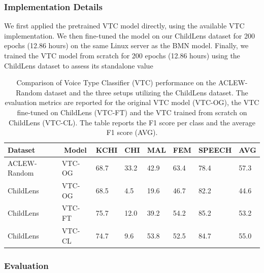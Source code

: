 \documentclass[
  man,floatsintext]{apa6}
\begin{document}
\subsubsection{Implementation Details}\label{implementation-details-1}

We first applied the pretrained VTC model directly, using the available VTC implementation. We then fine-tuned the model on our ChildLens dataset for 200 epochs (12.86 hours) on the same Linux server as the BMN model. Finally, we trained the VTC model from scratch for 200 epochs (12.86 hours) using the ChildLens dataset to assess its standalone value

\begin{table}[tbp]

\begin{center}
\begin{threeparttable}

\caption{\label{tab:vtc-results}Comparison of Voice Type Classifier (VTC) performance on the ACLEW-Random dataset and the three setups utilizing the ChildLens dataset. The evaluation metrics are reported for the original VTC model (VTC-OG), the VTC fine-tuned on ChildLens (VTC-FT) and the VTC trained from scratch on ChildLens (VTC-CL). The table reports the F1 score per class and the average F1 score (AVG).
}

\begin{tabular}{llllllll}
\toprule
Dataset & \multicolumn{1}{c}{Model} & \multicolumn{1}{c}{KCHI} & \multicolumn{1}{c}{CHI} & \multicolumn{1}{c}{MAL} & \multicolumn{1}{c}{FEM} & \multicolumn{1}{c}{SPEECH} & \multicolumn{1}{c}{AVG}\\
\midrule
ACLEW-Random & VTC-OG & 68.7 & 33.2 & 42.9 & 63.4 & 78.4 & 57.3\\
ChildLens & VTC-OG & 68.5 & 4.5 & 19.6 & 46.7 & 82.2 & 44.6\\
ChildLens & VTC-FT & 75.7 & 12.0 & 39.2 & 54.2 & 85.2 & 53.2\\
ChildLens & VTC-CL & 74.7 & 9.6 & 53.8 & 52.5 & 84.7 & 55.0\\
\bottomrule
\end{tabular}

\end{threeparttable}
\end{center}

\end{table}

\subsubsection{Evaluation}\label{evaluation-1}
\end{document}
